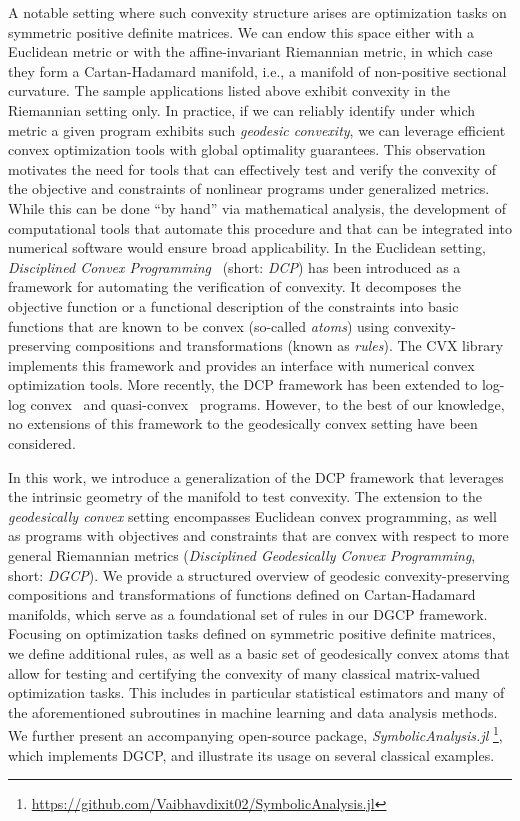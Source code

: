 \documentclass[twoside,11pt]{article}
\begin{document}
A notable setting where such convexity structure arises are optimization tasks on symmetric positive definite matrices. We can endow this space either with a Euclidean metric or with the affine-invariant Riemannian metric, in which case they form a Cartan-Hadamard manifold, i.e., a manifold of non-positive sectional curvature. The sample applications listed above exhibit convexity in the Riemannian setting only. In practice, if we can reliably identify under which metric a given program exhibits such \emph{geodesic convexity}, we can leverage efficient convex optimization tools with global optimality guarantees. This observation motivates the need for tools that can effectively test and verify the convexity of the objective and constraints of nonlinear programs under generalized metrics. While this can be done “by hand” via mathematical analysis, the development of computational tools that automate this procedure and that can be integrated into numerical software would ensure broad applicability. In the Euclidean setting, \emph{Disciplined Convex Programming}~\citep{grant2006disciplined} (short: \emph{DCP}) has been introduced as a framework for automating the verification of convexity. It decomposes the objective function or a functional description of the constraints into basic functions that are known to be convex (so-called \emph{atoms}) using convexity-preserving compositions and transformations (known as \emph{rules}). The CVX library~\citep{diamond2016cvxpy} implements this framework and provides an interface with numerical convex optimization tools. More recently, the DCP framework has been extended to log-log convex~\citep{dgp} and quasi-convex~\citep{dqp} programs. However, to the best of our knowledge, no extensions of this framework to the geodesically convex setting have been considered.

In this work, we introduce a generalization of the DCP framework that leverages the intrinsic geometry of the manifold to test convexity. The extension to the \emph{geodesically convex} setting encompasses Euclidean convex programming, as well as programs with objectives and constraints that are convex with respect to more general Riemannian metrics (\emph{Disciplined Geodesically Convex Programming}, short: \emph{DGCP}). 
We provide a structured overview of geodesic convexity-preserving compositions and transformations of functions defined on Cartan-Hadamard manifolds, which serve as a foundational set of rules in our DGCP framework.
Focusing on optimization tasks defined on symmetric positive definite matrices, we define additional rules, as well as a basic set of geodesically convex atoms that allow for testing and certifying the convexity of many classical matrix-valued optimization tasks. This includes in particular statistical estimators and many of the aforementioned subroutines in machine learning and data analysis methods. We further present an accompanying open-source package, \textsl{SymbolicAnalysis.jl} \footnote{\url{https://github.com/Vaibhavdixit02/SymbolicAnalysis.jl}}, which implements DGCP, and illustrate its usage on several classical examples.
\end{document}
